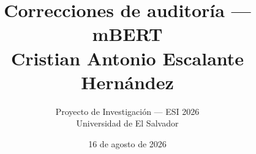 \title{Correcciones de auditoría --- mBERT\\
{\large Cristian Antonio Escalante Hernández}}
\author{Proyecto de Investigación --- ESI 2026\\
Universidad de El Salvador}
\date{16 de agosto de 2026}
